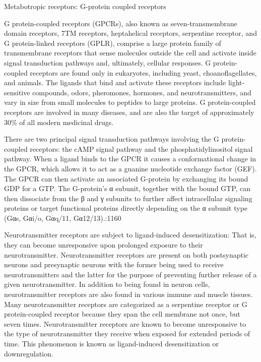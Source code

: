 Metabotropic receptors: G-protein coupled receptors

G protein-coupled receptors (GPCRs), also known as seven-transmembrane domain receptors, 7TM receptors, heptahelical receptors, serpentine receptor, and G protein-linked receptors (GPLR), comprise a large protein family of transmembrane receptors that sense molecules outside the cell and activate inside signal transduction pathways and, ultimately, cellular responses. G protein-coupled receptors are found only in eukaryotes, including yeast, choanoflagellates, and animals. The ligands that bind and activate these receptors include light-sensitive compounds, odors, pheromones, hormones, and neurotransmitters, and vary in size from small molecules to peptides to large proteins. G protein-coupled receptors are involved in many diseases, and are also the target of approximately 30\% of all modern medicinal drugs.

There are two principal signal transduction pathways involving the G protein-coupled receptors: the cAMP signal pathway and the phosphatidylinositol signal pathway. When a ligand binds to the GPCR it causes a conformational change in the GPCR, which allows it to act as a guanine nucleotide exchange factor (GEF). The GPCR can then activate an associated G-protein by exchanging its bound GDP for a GTP. The G-protein's α subunit, together with the bound GTP, can then dissociate from the β and γ subunits to further affect intracellular signaling proteins or target functional proteins directly depending on the α subunit type (Gαs, Gαi/o, Gαq/11, Gα12/13).:1160

Neurotransmitter receptors are subject to ligand-induced desensitization: That is, they can become unresponsive upon prolonged exposure to their neurotransmitter. Neurotransmitter receptors are present on both postsynaptic neurons and presynaptic neurons with the former being used to receive neurotransmitters and the latter for the purpose of preventing further release of a given neurotransmitter. In addition to being found in neuron cells, neurotransmitter receptors are also found in various immune and muscle tissues. Many neurotransmitter receptors are categorized as a serpentine receptor or G protein-coupled receptor because they span the cell membrane not once, but seven times. Neurotransmitter receptors are known to become unresponsive to the type of neurotransmitter they receive when exposed for extended periods of time. This phenomenon is known as ligand-induced desensitization or downregulation.

